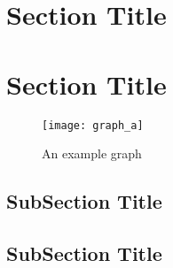 \section{Section Title}


\section{Section Title}
\begin{figure}[h]
\centering
\texttt{[image: graph\_a]}
\caption{An example graph}
\label{fig:x cubed graph}
\end{figure}


\subsection{SubSection Title}


\subsection{SubSection Title}
